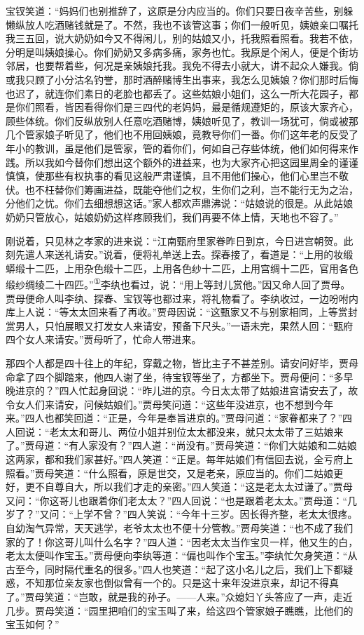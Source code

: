 宝钗笑道：``妈妈们也别推辞了，这原是分内应当的。你们只要日夜辛苦些，别躲懒纵放人吃酒赌钱就是了。不然，我也不该管这事；你们一般听见，姨娘亲口嘱托我三五回，说大奶奶如今又不得闲儿，别的姑娘又小，托我照看照看。我若不依，分明是叫姨娘操心。你们奶奶又多病多痛，家务也忙。我原是个闲人，便是个街坊邻居，也要帮着些，何况是亲姨娘托我。我免不得去小就大，讲不起众人嫌我。倘或我只顾了小分沽名钓誉，那时酒醉赌博生出事来，我怎么见姨娘？你们那时后悔也迟了，就连你们素日的老脸也都丢了。这些姑娘小姐们，这么一所大花园子，都是你们照看，皆因看得你们是三四代的老妈妈，最是循规遵矩的，原该大家齐心，顾些体统。你们反纵放别人任意吃酒赌博，姨娘听见了，教训一场犹可，倘或被那几个管家娘子听见了，他们也不用回姨娘，竟教导你们一番。你们这年老的反受了年小的教训，虽是他们是管家，管的着你们，何如自己存些体统，他们如何得来作践。所以我如今替你们想出这个额外的进益来，也为大家齐心把这园里周全的谨谨慎慎，使那些有权执事的看见这般严肃谨慎，且不用他们操心，他们心里岂不敬伏。也不枉替你们筹画进益，既能夺他们之权，生你们之利，岂不能行无为之治，分他们之忧。你们去细想想这话。''家人都欢声鼎沸说：``姑娘说的很是。从此姑娘奶奶只管放心，姑娘奶奶这样疼顾我们，我们再要不体上情，天地也不容了。''

刚说着，只见林之孝家的进来说：``江南甄府里家眷昨日到京，今日进宫朝贺。此刻先遣人来送礼请安。''说着，便将礼单送上去。探春接了，看道是：``上用的妆缎蟒缎十二匹，上用杂色缎十二匹，上用各色纱十二匹，上用宫绸十二匹，官用各色缎纱绸绫二十四匹。''\href{../Text/part0060_split_000.html\#lnkback_1_a}{\textsuperscript{①}}李纨也看过，说：``用上等封儿赏他。''因又命人回了贾母。贾母便命人叫李纨、探春、宝钗等也都过来，将礼物看了。李纨收过，一边吩咐内库上人说：``等太太回来看了再收。''贾母因说：``这甄家又不与别家相同，上等赏封赏男人，只怕展眼又打发女人来请安，预备下尺头。''一语未完，果然人回：``甄府四个女人来请安。''贾母听了，忙命人带进来。

那四个人都是四十往上的年纪，穿戴之物，皆比主子不甚差别。请安问好毕，贾母命拿了四个脚踏来，他四人谢了坐，待宝钗等坐了，方都坐下。贾母便问：``多早晚进京的？''四人忙起身回说：``昨儿进的京。今日太太带了姑娘进宫请安去了，故令女人们来请安，问候姑娘们。''贾母笑问道：``这些年没进京，也不想到今年来。''四人也都笑回道：``正是，今年是奉旨进京的。''贾母问道：``家眷都来了？''四人回说：``老太太和哥儿、两位小姐并别位太太都没来，就只太太带了三姑娘来了。''贾母道：``有人家没有？''四人道：``尚没有。''贾母笑道：``你们大姑娘和二姑娘这两家，都和我们家甚好。''四人笑道：``正是。每年姑娘们有信回去说，全亏府上照看。''贾母笑道：``什么照看，原是世交，又是老亲，原应当的。你们二姑娘更好，更不自尊自大，所以我们才走的亲密。''四人笑道：``这是老太太过谦了。''贾母又问：``你这哥儿也跟着你们老太太？''四人回说：``也是跟着老太太。''贾母道：``几岁了？''又问：``上学不曾？''四人笑说：``今年十三岁。因长得齐整，老太太很疼。自幼淘气异常，天天逃学，老爷太太也不便十分管教。''贾母笑道：``也不成了我们家的了！你这哥儿叫什么名字？''四人道：``因老太太当作宝贝一样，他又生的白，老太太便叫作宝玉。''贾母便向李纨等道：``偏也叫作个宝玉。''李纨忙欠身笑道：``从古至今，同时隔代重名的很多。''四人也笑道：``起了这小名儿之后，我们上下都疑惑，不知那位亲友家也倒似曾有一个的。只是这十来年没进京来，却记不得真了。''贾母笑道：``岂敢，就是我的孙子。------人来。''众媳妇丫头答应了一声，走近几步。贾母笑道：``园里把咱们的宝玉叫了来，给这四个管家娘子瞧瞧，比他们的宝玉如何？''

